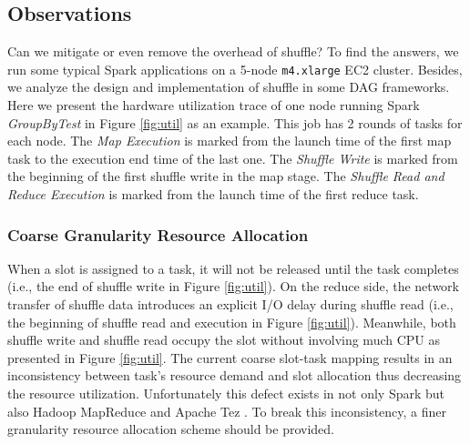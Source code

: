 \subsection{Observations} \label{observation}
Can we mitigate or even remove the overhead of shuffle? 
To find the answers, we run some typical Spark applications on a 5-node \texttt{m4.xlarge} EC2 cluster.
Besides, we analyze the design and implementation of shuffle in some DAG frameworks.
Here we present the hardware utilization trace of one node running Spark \textit{GroupByTest} in Figure \ref{fig:util} as an example. 
This job has 2 rounds of tasks for each node.
The \textit{Map Execution} is marked from the launch time of the first map task to the execution end time of the last one. 
The \textit{Shuffle Write} is marked from the beginning of the first shuffle write in the map stage. 
The \textit{Shuffle Read and Reduce Execution} is marked from the launch time of the first reduce task.
\subsubsection{Coarse Granularity Resource Allocation}
When a slot is assigned to a task, it will not be released until the task completes (i.e., the end of shuffle write in Figure \ref{fig:util}). 
On the reduce side, the network transfer of shuffle data introduces an explicit I/O delay during shuffle read (i.e., the beginning of shuffle read and execution in Figure \ref{fig:util}). 
Meanwhile, both shuffle write and shuffle read occupy the slot without involving much CPU as presented in Figure \ref{fig:util}. 
The current coarse slot-task mapping results in an inconsistency between task's resource demand and slot allocation thus decreasing the resource utilization. 
Unfortunately this defect exists in not only Spark \cite{apachespark} but also Hadoop MapReduce \cite{hadoop} and Apache Tez \cite{tez}. 
To break this inconsistency, a finer granularity resource allocation scheme should be provided. 

